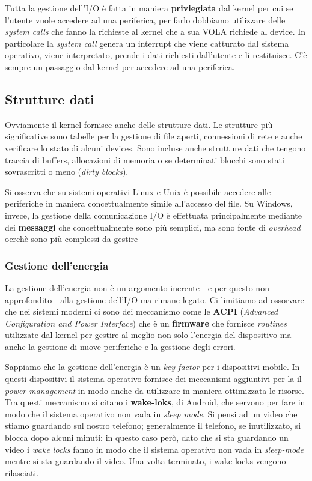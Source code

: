 Tutta la gestione dell'I/O è fatta in maniera \textbf{priviegiata} dal kernel per cui se l'utente vuole accedere ad una periferica, per farlo dobbiamo utilizzare delle \textit{system calls} che fanno la richieste al kernel che a sua VOLA richiede al device. In particolare la \textit{system call} genera un interrupt che viene catturato dal sistema operativo, viene interpretato, prende i dati richiesti dall'utente e li restituisce. C'è sempre un passaggio dal kernel per accedere ad una periferica. 

% 
\subsection{Strutture dati}
Ovviamente il kernel fornisce anche delle strutture dati. Le strutture più significative sono tabelle per la gestione di file aperti, connessioni di rete e anche verificare lo stato di alcuni devices. Sono incluse anche strutture dati che tengono traccia di buffers, allocazioni di memoria o se determinati blocchi sono stati sovrascritti o meno (\textit{dirty blocks}).

Si osserva che su sistemi operativi Linux e Unix è possibile accedere alle periferiche in maniera concettualmente simile all'accesso del file. Su Windows, invece, la gestione della comunicazione I/O è effettuata principalmente mediante dei \textbf{messaggi} che concettualmente sono più semplici, ma sono fonte di \textit{overhead} oerchè sono più complessi da gestire

\subsubsection*{Gestione dell'energia}
La gestione dell'energia non è un argomento inerente - e per questo non approfondito - alla gestione dell'I/O ma rimane legato. Ci limitiamo ad ossorvare che nei sistemi moderni ci sono dei meccanismo come le \textbf{ACPI} (\textit{Advanced Configuration and Power Interface}) che è un \textbf{firmware} che fornisce \textit{routines} utilizzate dal kernel per gestire al meglio non solo l'energia del dispositivo ma anche la gestione di nuove periferiche e la gestione degli errori.

Sappiamo che la gestione dell'energia è un \textit{key factor} per i dispositivi mobile. In questi dispositivi il sistema operativo fornisce dei meccanismi aggiuntivi per la il \textit{power management} in modo anche da utilizzare in maniera ottimizzata le risorse. Tra questi meccanismo si citano i \textbf{wake-loks}, di Android, che servono per fare in modo che il sistema operativo non vada in \textit{sleep mode}. Si pensi ad un video che stiamo guardando sul nostro telefono; generalmente il telefono, se inutilizzato, si blocca dopo alcuni minuti: in questo caso però, dato che si sta guardando un video i \textit{wake locks} fanno in modo che il sistema operativo non vada in \textit{sleep-mode} mentre si sta guardando il video. Una volta terminato, i wake locks vengono rilasciati.

